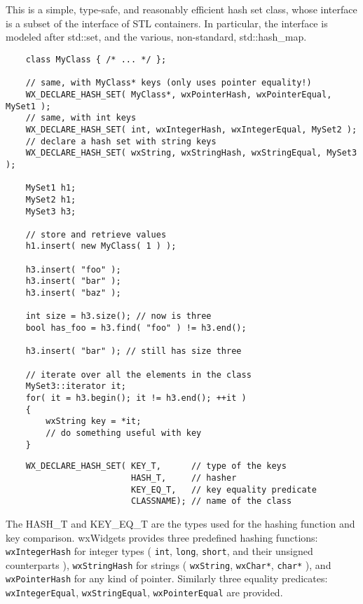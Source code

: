 \section{}\label{wxhashset}

This is a simple, type-safe, and reasonably efficient hash set class,
whose interface is a subset of the interface of STL containers. In
particular, the interface is modeled after std::set, and the various,
non-standard, std::hash\_map.


\begin{verbatim}
    class MyClass { /* ... */ };

    // same, with MyClass* keys (only uses pointer equality!)
    WX_DECLARE_HASH_SET( MyClass*, wxPointerHash, wxPointerEqual, MySet1 );
    // same, with int keys
    WX_DECLARE_HASH_SET( int, wxIntegerHash, wxIntegerEqual, MySet2 );
    // declare a hash set with string keys
    WX_DECLARE_HASH_SET( wxString, wxStringHash, wxStringEqual, MySet3 );

    MySet1 h1;
    MySet2 h1;
    MySet3 h3;

    // store and retrieve values
    h1.insert( new MyClass( 1 ) );

    h3.insert( "foo" );
    h3.insert( "bar" );
    h3.insert( "baz" );

    int size = h3.size(); // now is three
    bool has_foo = h3.find( "foo" ) != h3.end();

    h3.insert( "bar" ); // still has size three

    // iterate over all the elements in the class
    MySet3::iterator it;
    for( it = h3.begin(); it != h3.end(); ++it )
    {
        wxString key = *it;
        // do something useful with key
    }
\end{verbatim}


\begin{verbatim}
    WX_DECLARE_HASH_SET( KEY_T,      // type of the keys
                         HASH_T,     // hasher
                         KEY_EQ_T,   // key equality predicate
                         CLASSNAME); // name of the class
\end{verbatim}

The HASH\_T and KEY\_EQ\_T are the types
used for the hashing function and key comparison. wxWidgets provides
three predefined hashing functions: {\tt wxIntegerHash}
for integer types ( {\tt int}, {\tt long}, {\tt short},
and their unsigned counterparts ), {\tt wxStringHash} for strings
( {\tt wxString}, {\tt wxChar*}, {\tt char*} ), and
{\tt wxPointerHash} for any kind of pointer.
Similarly three equality predicates:
{\tt wxIntegerEqual}, {\tt wxStringEqual}, {\tt wxPointerEqual} are provided.


